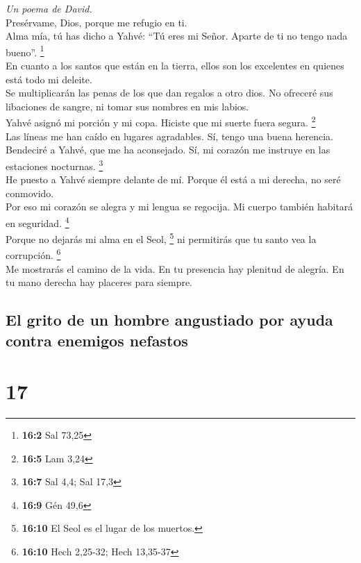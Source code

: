 \emph{Un poema de David.}\\
 Presérvame, Dios, porque me refugio en ti.\\
 Alma mía, tú has dicho a Yahvé: ``Tú eres mi Señor.
Aparte de ti no tengo nada bueno''. \footnote{\textbf{16:2} Sal 73,25}\\
 En cuanto a los santos que están en la tierra, ellos son
los excelentes en quienes está todo mi deleite.\\
 Se multiplicarán las penas de los que dan regalos a otro
dios. No ofreceré sus libaciones de sangre, ni tomar sus nombres en mis
labios.\\
 Yahvé asignó mi porción y mi copa. Hiciste que mi suerte
fuera segura. \footnote{\textbf{16:5} Lam 3,24}\\
 Las líneas me han caído en lugares agradables. Sí, tengo
una buena herencia.\\
 Bendeciré a Yahvé, que me ha aconsejado. Sí, mi corazón
me instruye en las estaciones nocturnas. \footnote{\textbf{16:7} Sal
  4,4; Sal 17,3}\\
 He puesto a Yahvé siempre delante de mí. Porque él está a
mi derecha, no seré conmovido.\\
 Por eso mi corazón se alegra y mi lengua se regocija. Mi
cuerpo también habitará en seguridad. \footnote{\textbf{16:9} Gén 49,6}\\
 Porque no dejarás mi alma en el Seol, \footnote{\textbf{16:10}
  El Seol es el lugar de los muertos.} ni permitirás que tu santo vea la
corrupción. \footnote{\textbf{16:10} Hech 2,25-32; Hech 13,35-37}\\
 Me mostrarás el camino de la vida. En tu presencia hay
plenitud de alegría. En tu mano derecha hay placeres para siempre.

\hypertarget{el-grito-de-un-hombre-angustiado-por-ayuda-contra-enemigos-nefastos}{%
\subsection{El grito de un hombre angustiado por ayuda contra enemigos
nefastos}\label{el-grito-de-un-hombre-angustiado-por-ayuda-contra-enemigos-nefastos}}

\hypertarget{section-16}{%
\section{17}\label{section-16}}

